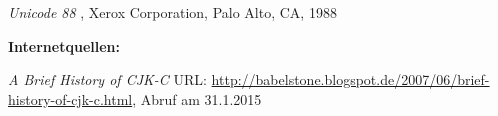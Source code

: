 \newpage
{}
  \begin{thebibliography}{}



	 {\sl Unicode 88} , Xerox Corporation, Palo Alto, CA, 1988
	
	\textbf{Internetquellen:}
	 
	 {\sl A Brief History of CJK-C} URL: \url{http://babelstone.blogspot.de/2007/06/brief-history-of-cjk-c.html}, Abruf am 31.1.2015

  \end{thebibliography}
